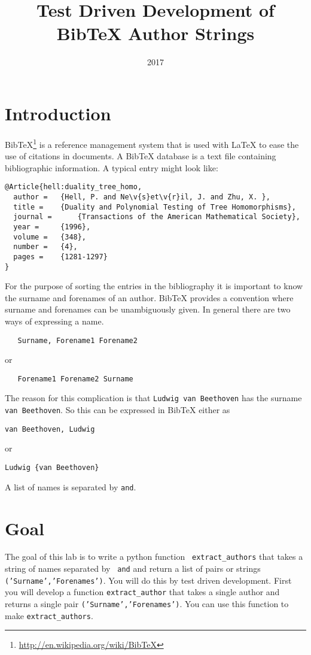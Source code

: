 \documentclass[10pt]{paper}
\title{Test Driven Development of Bib\TeX{} Author Strings}
\date{2017}
\begin{document}
\maketitle
\section*{Introduction}
Bib\TeX\footnote{\url{http://en.wikipedia.org/wiki/BibTeX}} is a
reference management system that is used with La\TeX{} to ease the use
of citations in documents. A Bib\TeX{} database is a text file
containing bibliographic information. A typical entry might look like:
\begin{verbatim}
@Article{hell:duality_tree_homo,
  author = 	 {Hell, P. and Ne\v{s}et\v{r}il, J. and Zhu, X. },
  title = 	 {Duality and Polynomial Testing of Tree Homomorphisms},
  journal = 	 {Transactions of the American Mathematical Society},
  year = 	 {1996},
  volume =	 {348},
  number =	 {4},
  pages =	 {1281-1297}
}
\end{verbatim}

For the purpose of sorting the entries in the bibliography it is
important to know the surname and forenames of an author. Bib\TeX{}
provides a convention where surname and forenames can be unambiguously
given. In general there are two ways of expressing a name.
\begin{verbatim}
   Surname, Forename1 Forename2
\end{verbatim}
or
\begin{verbatim}
   Forename1 Forename2 Surname
\end{verbatim}
The reason for this complication is that {\tt Ludwig van Beethoven}
has the surname {\tt van Beethoven}. So this can be expressed in
Bib\TeX{} either as 
\begin{verbatim}
van Beethoven, Ludwig
\end{verbatim}
or
\begin{verbatim}
Ludwig {van Beethoven}
\end{verbatim}

A list of names is separated by {\tt and}. 

\section*{Goal}
The goal of this lab is to write a python function {\tt
  extract\_authors} that takes a string of names separated by {\tt
  and}  and return a list of pairs or strings {\tt
  ('Surname','Forenames')}.
You will do this by test driven development. First you will develop a
function {\tt extract\_author} that takes a single author and returns a
single pair {\tt   ('Surname','Forenames')}.  You can use this
function to make {\tt extract\_authors}.
\end{document}
